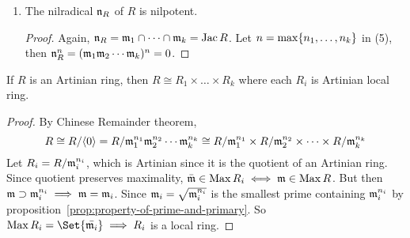 \begin{prop}
\begin{enumerate}[(1)]
\begin{proof}
        Now, let $n_i$ be the one so that $\mf_i^{n_i} = \mf_{i+1}^{n_{i+1}}$.
        We claim that $\mf_1^{n_1}\mf_2^{n_2} \dotsm \mf_k^{n_k} = \gen{0}$.

        If not, let $\Sc = \Set{J \subseteq R \given J \mf_1^{n_1}
          \mf_2^{n_2} \dotsm \mf_k^{n_k} \neq 0} \neq \varnothing$
        since $\mf_i \in S$.
        By the fact that $R$ is Artinian, there exists
        a minimal element $J_0 \in \Sc$.
        By definition of $\Sc$, Exists $x \in J_0$ so that $x\mf_1^{n_1}\mf_2^{n_2} \dotsm \mf_k^{n_k}
        \neq 0$. Then $\gen{x} \in \Sc$ $\gen{x} \subseteq J_0$
        which by the minimality we must have $\gen{x} = J_0$.\\

        Also, $x \mf_1^{n_1+1}\mf_2^{n_2+1} \dotsm \mf_k^{n_k+1} =
        x \mf_1^{n_1}\mf_2^{n_2} \dotsm \mf_k^{n_k} \ne \gen{0}$,
        so $I = x \mf_1\dots \mf_k\in S$ and $I \subseteq xR = J_0 \implies I = xR$.
        Then we have $\mf_1 \mf_2 \dotsm \mf_k = \mf_1 \cap \mf_2 \cap \dots \cap \mf_k = \Jac R$
        with $\Jac R (xR) = xR$ since $\Max R = \Spec R$. By Nakayama's lemma, $xR = 0 \implies x = 0$
        which leads to an contradiction.
      \end{proof}
    \item The nilradical $\mathfrak{n}_R$ of $R$ is nilpotent.
      \begin{proof}
        Again, $\mathfrak{n}_R = \mathfrak{m}_1 \cap \dotsb \cap \mathfrak{m}_k = \operatorname{Jac} R$. Let
        $n = \max \lbrace n_1, \dots, n_k\rbrace$ in (5), then
        $\mathfrak{n}_R^n = (\mathfrak{m}_1\mathfrak{m}_2 \dotsm\mathfrak{m}_k)^n = 0$.
      \end{proof}
  \end{enumerate}
\end{prop}

\begin{theorem}
  If $R$ is an Artinian ring,
  then $R \cong R_1 \times \dots \times R_k$ where each $R_i$ is Artinian local ring.
\begin{proof}
  By Chinese Remainder theorem,
  \[
    R \cong {R}/{\langle0\rangle} = {R}/{\mathfrak{m}_1^{n_1}\mathfrak{m}_2^{n_2} \dotsm \mathfrak{m}_k^{n_k}}
    \cong 
    {R}/{\mathfrak{m}_1^{n_1}} \times {R}/{\mathfrak{m}_2^{n_2}} \times \dots \times {R}/{\mathfrak{m}_k^{n_k}}
  \]
  Let $R_i = {R}/{\mathfrak{m}_i^{n_i}}$, which is Artinian since
  it is the quotient of an Artinian ring. Since
  quotient preserves maximality, $\bar{\mathfrak{m}} \in \operatorname{Max} R_i \iff
  \mathfrak{m} \in \operatorname{Max} R$. But then $\mathfrak{m} \supset \mathfrak{m}_i^{n_i} \implies \mathfrak{m} = \mathfrak{m}_i$.
  Since $\mathfrak{m}_i = \sqrt{\mathfrak{m}_i^{n_i}}$ is the smallest prime containing $\mathfrak{m}_i^{n_i}$
  by proposition~\ref{prop:property-of-prime-and-primary}.
  So $\Max R_i = \Set{\bar{\mf_i}} \implies R_i$ is a local ring.
\end{proof}
\end{theorem}

